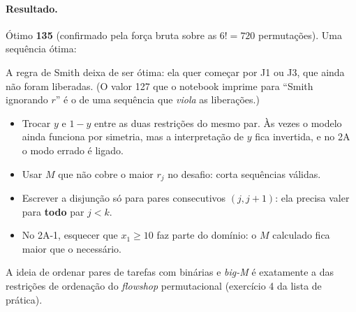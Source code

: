 \paragraph{Resultado.} Ótimo \textbf{135} (confirmado pela força bruta sobre as $6!=720$ permutações). Uma
sequência ótima:
\begin{center}
\end{center}
A regra de Smith deixa de ser ótima: ela quer começar por J1 ou J3, que ainda não foram liberadas. (O valor 127 que
o notebook imprime para ``Smith ignorando $r$'' é o de uma sequência que \emph{viola} as liberações.)

\begin{atencao}
\begin{itemize}
  \item Trocar $y$ e $1-y$ entre as duas restrições do mesmo par. Às vezes o modelo ainda funciona por simetria, mas
  a interpretação de $y$ fica invertida, e no 2A o modo errado é ligado.
  \item Usar $M$ que não cobre o maior $r_j$ no desafio: corta sequências válidas.
  \item Escrever a disjunção só para pares consecutivos $(j,j+1)$: ela precisa valer para \textbf{todo} par $j<k$.
  \item No 2A-1, esquecer que $x_1\ge10$ faz parte do domínio: o $M$ calculado fica maior que o necessário.
\end{itemize}
\end{atencao}

\begin{resumo}
A ideia de ordenar pares de tarefas com binárias e \emph{big-M} é exatamente a das restrições de ordenação do
\emph{flowshop} permutacional (exercício 4 da lista de prática).
\end{resumo}
